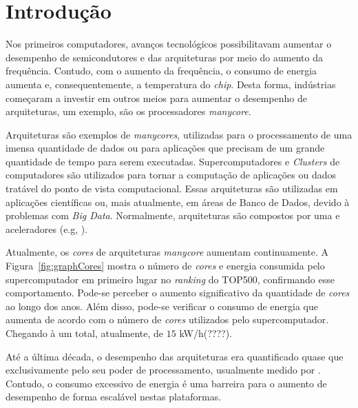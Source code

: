 \chapter{Introdução}


Nos primeiros computadores, avanços tecnológicos possibilitavam aumentar o desempenho de semicondutores e das arquiteturas por meio do aumento da frequência. Contudo, com o aumento da frequência, o consumo de energia aumenta e, consequentemente, a temperatura do \textit{chip}. Desta forma, indústrias começaram a investir em outros meios para aumentar o desempenho de arquiteturas, um exemplo, são os processadores \textit{manycore}.

Arquiteturas \hpc são exemplos de \textit{manycores}, utilizadas para o processamento de uma imensa quantidade de dados ou para aplicações que precisam de um grande quantidade de tempo para serem executadas. Supercomputadores e \textit{Clusters} de computadores são utilizados para tornar a computação de aplicações ou dados tratável do ponto de vista computacional. Essas arquiteturas são utilizadas em aplicações científicas ou, mais atualmente, em áreas de Banco de Dados, devido à problemas com \textit{Big Data}. Normalmente, arquiteturas \hpc são compostos por uma \cpu{} e aceleradores (e.g, \gpu).

Atualmente, os \textit{cores} de arquiteturas \textit{manycore} aumentam continuamente. A Figura~\ref{fig:graphCores} mostra o número de \textit{cores} e energia consumida pelo supercomputador em primeiro lugar no \textit{ranking} do TOP500, confirmando esse comportamento. Pode-se perceber o aumento significativo da quantidade de \textit{cores} ao longo dos anos.
Além disso, pode-se verificar o consumo de energia que aumenta de acordo com o número de \textit{cores} utilizados pelo supercomputador.
Chegando à um total, atualmente, de $15$ kW/h(????).




Até a última década, o desempenho das arquiteturas \hpc era quantificado quase que exclusivamente pelo seu poder de processamento, usualmente medido por \flops. Contudo, o consumo excessivo de energia é uma barreira para o aumento de desempenho de forma escalável nestas plataformas.

